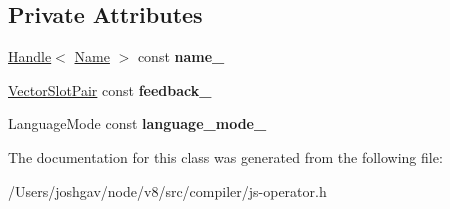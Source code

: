 \subsection*{Private Attributes}
\begin{DoxyCompactItemize}
\item 
\hyperlink{classv8_1_1internal_1_1_handle}{Handle}$<$ \hyperlink{classv8_1_1internal_1_1_name}{Name} $>$ const {\bfseries name\+\_\+}\hypertarget{classv8_1_1internal_1_1compiler_1_1_named_access_a22411bc9d2dfaa957695eb662476bff9}{}\label{classv8_1_1internal_1_1compiler_1_1_named_access_a22411bc9d2dfaa957695eb662476bff9}

\item 
\hyperlink{classv8_1_1internal_1_1compiler_1_1_vector_slot_pair}{Vector\+Slot\+Pair} const {\bfseries feedback\+\_\+}\hypertarget{classv8_1_1internal_1_1compiler_1_1_named_access_a351a395fb820d5fb452dfce95a0badf9}{}\label{classv8_1_1internal_1_1compiler_1_1_named_access_a351a395fb820d5fb452dfce95a0badf9}

\item 
Language\+Mode const {\bfseries language\+\_\+mode\+\_\+}\hypertarget{classv8_1_1internal_1_1compiler_1_1_named_access_a6cefa929ea4c86c77d97c27b1ba518f7}{}\label{classv8_1_1internal_1_1compiler_1_1_named_access_a6cefa929ea4c86c77d97c27b1ba518f7}

\end{DoxyCompactItemize}


The documentation for this class was generated from the following file\+:\begin{DoxyCompactItemize}
\item 
/\+Users/joshgav/node/v8/src/compiler/js-\/operator.\+h\end{DoxyCompactItemize}
